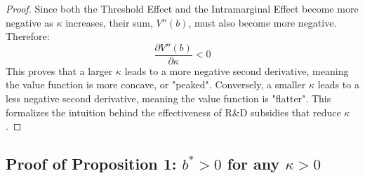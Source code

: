 \begin{proof}
    Since both the Threshold Effect and the Intramarginal Effect become more negative as $\kappa$ increases, their sum, $V''(b)$, must also become more negative. Therefore:
    $$ \frac{\partial V''(b)}{\partial \kappa} < 0 $$
    This proves that a larger $\kappa$ leads to a more negative second derivative, meaning the value function is more concave, or "peaked". Conversely, a smaller $\kappa$ leads to a less negative second derivative, meaning the value function is "flatter". This formalizes the intuition behind the effectiveness of R\&D subsidies that reduce $\kappa$.
    \end{proof}

\subsection{Proof of Proposition 1: $b^* > 0$ for any $\kappa > 0$}

